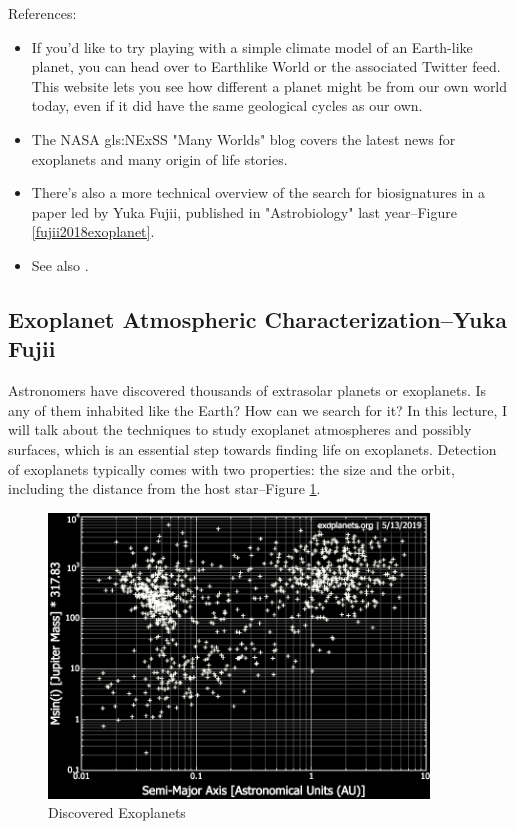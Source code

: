 \documentclass[]{article}
\begin{document}
References:
\begin{itemize}
	\item If you'd like to try playing with a simple climate model of an Earth-like planet, you can head over to Earthlike World \cite{earthlike.world} or the associated Twitter feed. This website lets you see how different a planet might be from our own world today, even if it did have the same geological cycles as our own.

	\item The NASA \gls{gls:NExSS} "Many Worlds" blog\cite{nexss.info} covers the latest news for exoplanets and many origin of life stories.

	\item There's also a more technical overview of the search for biosignatures in a paper led by Yuka Fujii, published in "Astrobiology" last year--Figure \ref{fujii2018exoplanet}.

	\item See also \cite{villanueva2015unique}.
\end{itemize}

\subsection[Exoplanet Atmospheric Characterization]{Exoplanet Atmospheric Characterization--Yuka Fujii}

Astronomers have discovered
thousands of extrasolar planets
or exoplanets.
Is any of them inhabited like the Earth?
How can we search for it?
In this lecture, I will talk about
the techniques to study exoplanet
atmospheres and possibly surfaces,
which is an essential step towards
finding life on exoplanets.
Detection of exoplanets typically
comes with two properties:
the size and the orbit,
including the distance from the host star--Figure \ref{fig:discovered:exoplanets}.

\begin{figure}[H]
	\caption{Discovered Exoplanets}\label{fig:discovered:exoplanets}
	\includegraphics[width=0.9\textwidth]{ExoplanetCharacteristics}
\end{figure} 
\end{document}
